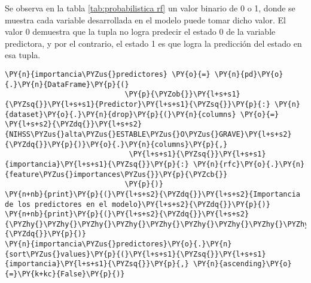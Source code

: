     Se observa en la tabla \ref{tab:probabilistica rf} un valor binario de 0 o 1, donde se muestra cada variable
desarrollada en el modelo puede tomar dicho valor. El valor 0 demuestra
que la tupla no logra predecir el estado 0 de la variable predictora, y
por el contrario, el estado 1 es que logra la predicción del estado en
esa tupla.

    \begin{tcolorbox}[breakable, size=fbox, boxrule=1pt, pad at break*=1mm,colback=cellbackground, colframe=cellborder]
\begin{Verbatim}[commandchars=\\\{\}]
\PY{n}{importancia\PYZus{}predictores} \PY{o}{=} \PY{n}{pd}\PY{o}{.}\PY{n}{DataFrame}\PY{p}{(}
                            \PY{p}{\PYZob{}}\PY{l+s+s1}{\PYZsq{}}\PY{l+s+s1}{Predictor}\PY{l+s+s1}{\PYZsq{}}\PY{p}{:} \PY{n}{dataset}\PY{o}{.}\PY{n}{drop}\PY{p}{(}\PY{n}{columns} \PY{o}{=} \PY{l+s+s2}{\PYZdq{}}\PY{l+s+s2}{NIHSS\PYZus{}alta\PYZus{}ESTABLE\PYZus{}O\PYZus{}GRAVE}\PY{l+s+s2}{\PYZdq{}}\PY{p}{)}\PY{o}{.}\PY{n}{columns}\PY{p}{,}
                             \PY{l+s+s1}{\PYZsq{}}\PY{l+s+s1}{importancia}\PY{l+s+s1}{\PYZsq{}}\PY{p}{:} \PY{n}{rfc}\PY{o}{.}\PY{n}{feature\PYZus{}importances\PYZus{}}\PY{p}{\PYZcb{}}
                            \PY{p}{)}
\PY{n+nb}{print}\PY{p}{(}\PY{l+s+s2}{\PYZdq{}}\PY{l+s+s2}{Importancia de los predictores en el modelo}\PY{l+s+s2}{\PYZdq{}}\PY{p}{)}
\PY{n+nb}{print}\PY{p}{(}\PY{l+s+s2}{\PYZdq{}}\PY{l+s+s2}{\PYZhy{}\PYZhy{}\PYZhy{}\PYZhy{}\PYZhy{}\PYZhy{}\PYZhy{}\PYZhy{}\PYZhy{}\PYZhy{}\PYZhy{}\PYZhy{}\PYZhy{}\PYZhy{}\PYZhy{}\PYZhy{}\PYZhy{}\PYZhy{}\PYZhy{}\PYZhy{}\PYZhy{}\PYZhy{}\PYZhy{}\PYZhy{}\PYZhy{}\PYZhy{}\PYZhy{}\PYZhy{}\PYZhy{}\PYZhy{}\PYZhy{}\PYZhy{}\PYZhy{}\PYZhy{}\PYZhy{}\PYZhy{}\PYZhy{}\PYZhy{}\PYZhy{}\PYZhy{}\PYZhy{}\PYZhy{}\PYZhy{}}\PY{l+s+s2}{\PYZdq{}}\PY{p}{)}
\PY{n}{importancia\PYZus{}predictores}\PY{o}{.}\PY{n}{sort\PYZus{}values}\PY{p}{(}\PY{l+s+s1}{\PYZsq{}}\PY{l+s+s1}{importancia}\PY{l+s+s1}{\PYZsq{}}\PY{p}{,} \PY{n}{ascending}\PY{o}{=}\PY{k+kc}{False}\PY{p}{)}
\end{Verbatim}
\end{tcolorbox}

